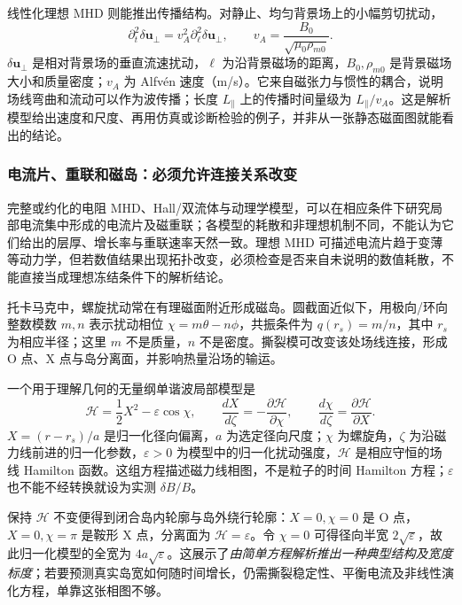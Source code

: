 \documentclass[12pt,fontset=none]{ctexart}
\numberwithin{equation}{section}
\numberwithin{table}{section}
\numberwithin{figure}{section}
\begin{document}
线性化理想 MHD 则能推出传播结构。对静止、均匀背景场上的小幅剪切扰动，
\begin{equation}\label{eq:micro-alfven}
 \partial_t^2\delta\bm u_\perp
 =v_A^2\partial_\ell^2\delta\bm u_\perp,
 \qquad v_A=\frac{B_0}{\sqrt{\mu_0\rho_{m0}}}.
\end{equation}
$\delta\bm u_\perp$ 是相对背景场的垂直流速扰动，$\ell$ 为沿背景磁场的距离，$B_0,\rho_{m0}$ 是背景磁场大小和质量密度；$v_A$ 为 Alfv\'en 速度（m/s）。它来自磁张力与惯性的耦合，说明场线弯曲和流动可以作为波传播；长度 $L_\parallel$ 上的传播时间量级为 $L_\parallel/v_A$。这是解析模型给出速度和尺度、再用仿真或诊断检验的例子，并非从一张静态磁面图就能看出的结论。

\subsubsection{电流片、重联和磁岛：必须允许连接关系改变}

完整或约化的电阻 MHD、Hall/双流体与动理学模型，可以在相应条件下研究局部电流集中形成的电流片及磁重联；各模型的耗散和非理想机制不同，不能认为它们给出的层厚、增长率与重联速率天然一致。理想 MHD 可描述电流片趋于变薄等动力学，但若数值结果出现拓扑改变，必须检查是否来自未说明的数值耗散，不能直接当成理想冻结条件下的解析结论。

托卡马克中，螺旋扰动常在有理磁面附近形成磁岛。圆截面近似下，用极向/环向整数模数 $m,n$ 表示扰动相位 $\chi=m\theta-n\phi$，共振条件为 $q(r_s)=m/n$，其中 $r_s$ 为相应半径；这里 $m$ 不是质量，$n$ 不是密度。撕裂模可改变该处场线连接，形成 O 点、X 点与岛分离面，并影响热量沿场的输运\cite{Pislands}。

一个用于理解几何的无量纲单谐波局部模型是
\begin{equation}\label{eq:micro-island}
 \mathcal H=\frac12X^2-\varepsilon\cos\chi,\qquad
 \frac{dX}{d\zeta}=-\frac{\partial\mathcal H}{\partial\chi},\qquad
 \frac{d\chi}{d\zeta}=\frac{\partial\mathcal H}{\partial X}.
\end{equation}
$X=(r-r_s)/a$ 是归一化径向偏离，$a$ 为选定径向尺度；$\chi$ 为螺旋角，$\zeta$ 为沿磁力线前进的归一化参数，$\varepsilon>0$ 为模型中的归一化扰动强度，$\mathcal H$ 是相应守恒的场线 Hamilton 函数。这组方程描述磁力线相图，不是粒子的时间 Hamilton 方程；$\varepsilon$ 也不能不经转换就设为实测 $\delta B/B$。

保持 $\mathcal H$ 不变便得到闭合岛内轮廓与岛外绕行轮廓：$X=0,\chi=0$ 是 O 点，$X=0,\chi=\pi$ 是鞍形 X 点，分离面为 $\mathcal H=\varepsilon$。令 $\chi=0$ 可得径向半宽 $2\sqrt\varepsilon$，故此归一化模型的全宽为 $4a\sqrt\varepsilon$。这展示了\emph{由简单方程解析推出一种典型结构及宽度标度}；若要预测真实岛宽如何随时间增长，仍需撕裂稳定性、平衡电流及非线性演化方程，单靠这张相图不够。
\end{document}
